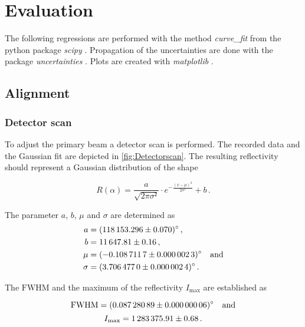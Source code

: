 \section{Evaluation}
\label{sec:auswertung}

%
The following regressions are performed with the method \textit{curve\_fit} from the python \cite{py} package \textit{scipy} \cite{scipy}.
Propagation of the uncertainties are done with the package \textit{uncertainties} \cite{uncertainties}.
Plots are created with \textit{matplotlib} \cite{matplotlib}.

\subsection{Alignment}

\subsubsection{Detector scan}

To adjust the primary beam a detector scan is performed.
The recorded data and the Gaussian fit are depicted in \autoref{fig:Detectorscan}.
The resulting reflectivity should represent a Gaussian distribution of the shape

\begin{equation*}
    R\left(\alpha\right) = \frac{a}{\sqrt{2\pi\sigma²}} \cdot e^{-\frac{\left(x -\mu\right)^2}{2\sigma^2}} + b \,.
\end{equation*}

The parameter $a$, $b$, $\mu$ and $\sigma$ are determined as 
\begin{align*}
    a &=  \SI{118153.296 \pm 0.070}{\degree}\,, \\
    b & = \num{11647.81 \pm 0.16}\,, \\
    \mu    &= \SI{ -0.1087117 \pm   0.0000023}{\degree}\quad \text{and} \\
    \sigma &= \SI{  3.706477 \pm  0.0000024}{\degree}\,. \\
\end{align*}

The $\text{FWHM}$ and the maximum of the reflectivity $I_\text{max}$ are established as 

\begin{equation*}
    \text{FWHM} = \SI{0.08728089 \pm 0.00000006}{\degree} \quad \text{and}
\end{equation*}
\begin{equation*}
    I_{\text{max}} = \num{1283375.91 \pm 0.68}\,.
\end{equation*}


